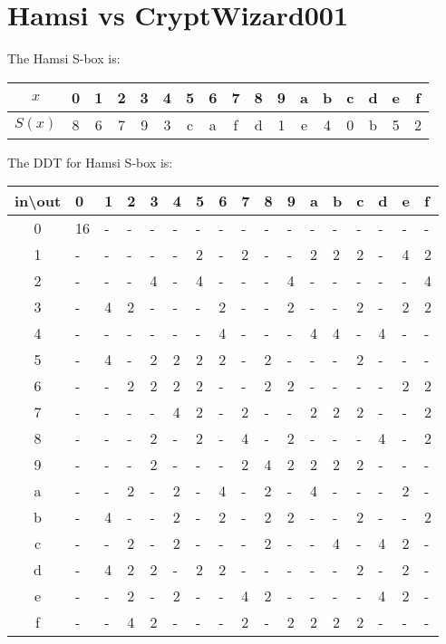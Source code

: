 \documentclass[12pt]{article}
\begin{document}
\section{Hamsi vs CryptWizard001}
\begin{large}
The Hamsi S-box is:
\begin{center}

\begin{tabular}{|c|c|c|c|c|c|c|c|c|c|c|c|c|c|c|c|c|}
\hline
$x$ & 0 & 1 & 2 & 3 & 4 & 5 & 6 & 7 & 8 & 9 & a & b & c & d & e & f\\\hline
$S(x)$ & 8 & 6 & 7 & 9 & 3 & c & a & f & d & 1 & e & 4 & 0 & b & 5 & 2\\\hline
\end{tabular}

\end{center}

\vspace{1cm}
The DDT for Hamsi S-box is:

\begin{center}

\begin{tabular}{c||*{16}{p{0.5cm}}}
in\textbackslash out & 0 & 1 & 2 & 3 & 4 & 5 & 6 & 7 & 8 & 9 & a & b & c & d & e & f\\\hline
0 & 16 & - & - & - & - & - & - & - & - & - & - & - & - & - & - & - \\
1 & - & - & - & - & - & 2 & - & 2 & - & - & 2 & 2 & 2 & - & 4 & 2 \\
2 & - & - & - & 4 & - & 4 & - & - & - & 4 & - & - & - & - & - & 4 \\
3 & - & 4 & 2 & - & - & - & 2 & - & - & 2 & - & - & 2 & - & 2 & 2 \\
4 & - & - & - & - & - & - & 4 & - & - & - & 4 & 4 & - & 4 & - & - \\
5 & - & 4 & - & 2 & 2 & 2 & 2 & - & 2 & - & - & - & 2 & - & - & - \\
6 & - & - & 2 & 2 & 2 & 2 & - & - & 2 & 2 & - & - & - & - & 2 & 2 \\
7 & - & - & - & - & 4 & 2 & - & 2 & - & - & 2 & 2 & 2 & - & - & 2 \\
8 & - & - & - & 2 & - & 2 & - & 4 & - & 2 & - & - & - & 4 & - & 2 \\
9 & - & - & - & 2 & - & - & - & 2 & 4 & 2 & 2 & 2 & 2 & - & - & - \\
a & - & - & 2 & - & 2 & - & 4 & - & 2 & - & 4 & - & - & - & 2 & - \\
b & - & 4 & - & - & 2 & - & 2 & - & 2 & 2 & - & - & 2 & - & - & 2 \\
c & - & - & 2 & - & 2 & - & - & - & 2 & - & - & 4 & - & 4 & 2 & - \\
d & - & 4 & 2 & 2 & - & 2 & 2 & - & - & - & - & - & 2 & - & 2 & - \\
e & - & - & 2 & - & 2 & - & - & 4 & 2 & - & - & - & - & 4 & 2 & - \\
f & - & - & 4 & 2 & - & - & - & 2 & - & 2 & 2 & 2 & 2 & - & - & - \\


\end{tabular}
\end{center}
\end{large}
\end{document}
